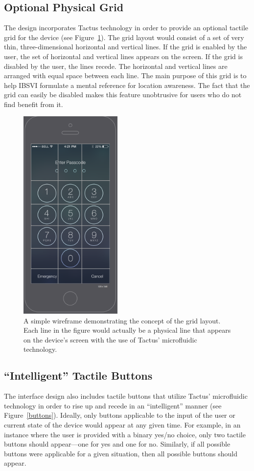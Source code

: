 \documentclass[11pt]{article}
\begin{document}
\subsection{Optional Physical Grid}
The design incorporates Tactus technology in order to provide an optional tactile grid for the device (see Figure~\ref{wireframe-grid}). The grid layout would consist of a set of very thin, three-dimensional horizontal and vertical lines. If the grid is enabled by the user, the set of horizontal and vertical lines appears on the screen. If the grid is disabled by the user, the lines recede. The horizontal and vertical lines are arranged with equal space between each line. The main purpose of this grid is to help IBSVI formulate a mental reference for location awareness. The fact that the grid can easily be disabled makes this feature unobtrusive for users who do not find benefit from it.


\begin{figure}[ht]
\centering
\includegraphics[width=2in]{wireframe-grid.png} 
\caption{A simple wireframe demonstrating the concept of the grid layout. Each line in the figure would actually be a physical line that appears on the device's screen with the use of Tactus' microfluidic technology.}
\label{wireframe-grid}
\end{figure}

\subsection{``Intelligent'' Tactile Buttons}
The interface design also includes tactile buttons that utilize Tactus' microfluidic technology in order to rise up and recede in an ``intelligent'' manner (see Figure~\ref{buttons}). Ideally, only buttons applicable to the input of the user or current state of the device would appear at any given time. For example, in an instance where the user is provided with a binary yes/no choice, only two tactile buttons should appear---one for yes and one for no. Similarly, if all possible buttons were applicable for a given situation, then all possible buttons should appear.
\end{document}

